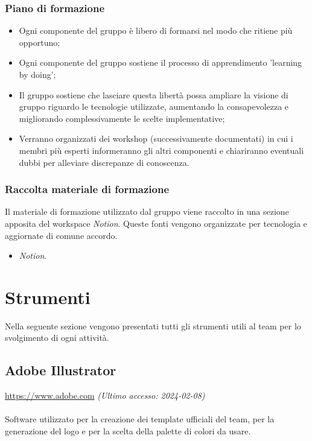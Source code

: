 \documentclass[10pt, a4paper]{article}
\begin{document}
\subsubsection{Piano di formazione}
\begin{itemize}
    \item Ogni componente del gruppo è libero di formarsi nel modo che ritiene più opportuno;
    \item Ogni componente del gruppo sostiene il processo di apprendimento 'learning by doing';
    \item Il gruppo sostiene che lasciare questa libertà possa ampliare la visione di gruppo riguardo le tecnologie utilizzate, aumentando la consapevolezza e migliorando complessivamente le scelte implementative;
    \item Verranno organizzati dei workshop (successivamente documentati) in cui i membri più esperti informeranno gli altri componenti e chiariranno eventuali dubbi per alleviare discrepanze di conoscenza.

\end{itemize}



\subsubsection{Raccolta materiale di formazione}
Il materiale di formazione utilizzato dal gruppo viene raccolto in una sezione apposita del workspace \textit{Notion}.
Queste fonti vengono organizzate per tecnologia e aggiornate di comune accordo.


\begin{itemize}
    \item \textit{Notion}.
\end{itemize}

\newpage

\newpage
\section{Strumenti}
Nella seguente sezione vengono presentati tutti gli strumenti utili al team per lo svolgimento di ogni attività.

\subsection{Adobe Illustrator}
\href{https://www.adobe.com}{https://www.adobe.com} \textit{(Ultimo accesso: 2024-02-08)}\\\\
Software utilizzato per la creazione dei template ufficiali del team, per la generazione del logo e per la scelta della palette di colori da usare. 
\end{document}
